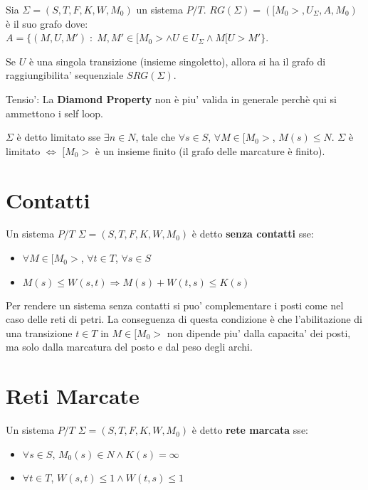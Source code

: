Sia $\Sigma = (S, T, F, K, W, M_0)$ un sistema $P/T$. $RG(\Sigma) = ([M_0>, U_\Sigma, A, M_0)$ \`e il suo grafo dove: \\

$A = \{ (M, U, M') \; : \; M,M' \in [M_0> \land U \in U_\Sigma \land M[U>M' \}$.

Se $U$ \`e una singola transizione (insieme singoletto), allora si ha il grafo di raggiungibilita' sequenziale $SRG(\Sigma)$.

Tensio': La \textbf{Diamond Property} non \`e piu' valida in generale perch\`e qui si ammettono i self loop.

$\Sigma$ \`e detto limitato sse $\exists n \in N$, tale che $\forall s \in S$, $\forall M \in [M_0>$, $M(s) \leq N$.
$\Sigma$ \`e limitato $\Leftrightarrow$ $[M_0>$ \`e un insieme finito (il grafo delle marcature \`e finito).


\section{Contatti}

Un sistema $P/T$ $\Sigma = (S, T, F, K, W, M_0)$ \`e detto \textbf{senza contatti} sse:
\begin{itemize}
  \item $\forall M \in [M_0>$, $\forall t \in T$, $\forall s \in S$
  \item $M(s) \leq W(s, t) \Rightarrow M(s) + W(t, s) \leq K(s)$
\end{itemize}

Per rendere un sistema senza contatti si puo' complementare i posti come nel caso delle reti di petri.
La conseguenza di questa condizione \`e che l'abilitazione di una transizione $t \in T$ in $M \in [M_0>$ non dipende piu' dalla capacita' dei posti, ma solo dalla marcatura del posto e dal peso degli archi.

\section{Reti Marcate}

Un sistema $P/T$ $\Sigma = (S, T, F, K, W, M_0)$ \`e detto \textbf{rete marcata} sse:

\begin{itemize}
  \item $\forall s \in S$, $M_0(s) \in N \land K(s) = \infty$
  \item $\forall t \in T$, $W(s, t) \leq 1 \land W(t, s) \leq 1$
\end{itemize}

